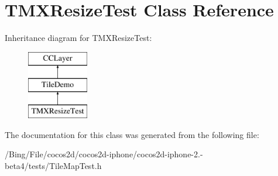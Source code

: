 \hypertarget{interface_t_m_x_resize_test}{\section{T\-M\-X\-Resize\-Test Class Reference}
\label{interface_t_m_x_resize_test}
}
Inheritance diagram for T\-M\-X\-Resize\-Test\-:\begin{figure}[H]
\begin{center}
\leavevmode
\includegraphics[height=3.000000cm]{interface_t_m_x_resize_test}
\end{center}
\end{figure}


The documentation for this class was generated from the following file\-:\begin{DoxyCompactItemize}
\item 
/\-Bing/\-File/cocos2d/cocos2d-\/iphone/cocos2d-\/iphone-\/2.-\/beta4/tests/Tile\-Map\-Test.\-h\end{DoxyCompactItemize}
